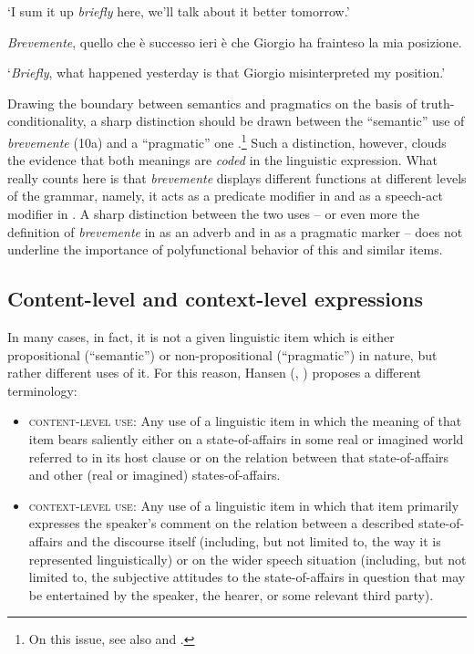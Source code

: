 \glt ‘I sum it up \textit{briefly} here, we’ll talk about it better tomorrow.’

\ex \label{ex:key:10b} \textit{Brevemente}, quello che è successo ieri è che Giorgio ha frainteso la mia posizione.

\glt ‘\textit{Briefly}, what happened yesterday is that Giorgio misinterpreted my position.’
\z
\z


Drawing the boundary between semantics and pragmatics on the basis of truth-conditionality, a sharp distinction should be drawn between the “semantic” use of \textit{brevemente} (10a) and a “pragmatic” one .\footnote{On this issue, see also \citet{Dijk1979} and \citet[76–86]{Sweetser1990}.} Such a distinction, however, clouds the evidence that both meanings are \textit{coded} in the linguistic expression. What really counts here is that \textit{brevemente} displays different functions at different levels of the grammar, namely, it acts as a predicate modifier in  and as a speech-act modifier in . A sharp distinction between the two uses – or even more the definition of \textit{brevemente} in  as an adverb and in  as a pragmatic marker – does not underline the importance of polyfunctional behavior of this and similar items.

\subsection{Content-level and context-level expressions}
\hypertarget{Toc124860629}{}
In many cases, in fact, it is not a given linguistic item which is either propositional (“semantic”) or non-propositional (“pragmatic”) in nature, but rather different uses of it. For this reason, Hansen (\citeyear[14–17]{Hansen2008}, \citeyear[592–594]{Hansen2012}) proposes a different terminology:

\begin{itemize}
   
\item \textsc{content-level} \textsc{use}: Any use of a linguistic item in which the meaning of that item bears saliently either on a state-of-affairs in some real or imagined world referred to in its host clause or on the relation between that state-of-affairs and other (real or imagined) states-of-affairs.

\item \textsc{context-level} \textsc{use}: Any use of a linguistic item in which that item primarily expresses the speaker’s comment on the relation between a described state-of-affairs and the discourse itself (including, but not limited to, the way it is represented linguistically) or on the wider speech situation (including, but not limited to, the subjective attitudes to the state-of-affairs in question that may be entertained by the speaker, the hearer, or some relevant third party).

\end{itemize}

